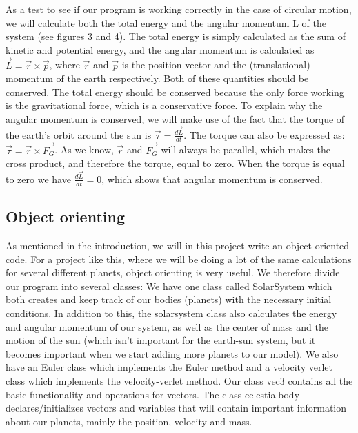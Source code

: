 \documentclass[twocolumn]{article}
\begin{document}
As a test to see if our program is working correctly in the case of circular motion, we will calculate both the total energy and the angular momentum L of the system (see figures 3 and 4). The total energy is simply calculated as the sum of kinetic and potential energy, and the angular momentum is calculated as $\vec{L} = \vec{r} \times \vec{p}$, where $\vec{r}$ and $\vec{p}$ is the position vector and the (translational) momentum of the earth respectively. Both of these quantities should be conserved.
The total energy should be conserved because the only force working is the gravitational force, which is a conservative force.\newline
To explain why the angular momentum is conserved, we will make use of the fact that the torque of the earth's orbit around the sun is $\vec{\tau} = \frac{d\vec{L}}{dt}$. The torque can also be expressed as: $\vec{\tau} = \vec{r} \times \vec{F_G}$. As we know, $\vec{r}$ and $\vec{F_G}$ will always be parallel, which makes the cross product, and therefore the torque, equal to zero. When the torque is equal to zero we have $\frac{d\vec{L}}{dt} = 0$, which shows that angular momentum is conserved.

\subsection*{Object orienting}
As mentioned in the introduction, we will in this project write an object oriented code. For a project like this, where we will be doing a lot of the same calculations for several different planets, object orienting is very useful. We therefore divide our program into several classes:\newline
We have one class called SolarSystem which both creates and keep track of our bodies (planets) with the necessary initial conditions. In addition to this, the solarsystem class also calculates the energy and angular momentum of our system, as well as the center of mass and the motion of the sun (which isn't important for the earth-sun system, but it becomes important when we start adding more planets to our model).\newline
We also have an Euler class which implements the Euler method and a velocity verlet class which implements the velocity-verlet method.\newline
Our class vec3 contains all the basic functionality and operations for vectors.
The class celestialbody declares/initializes vectors and variables that will contain important information about our planets, mainly the position, velocity and mass.
\end{document}
